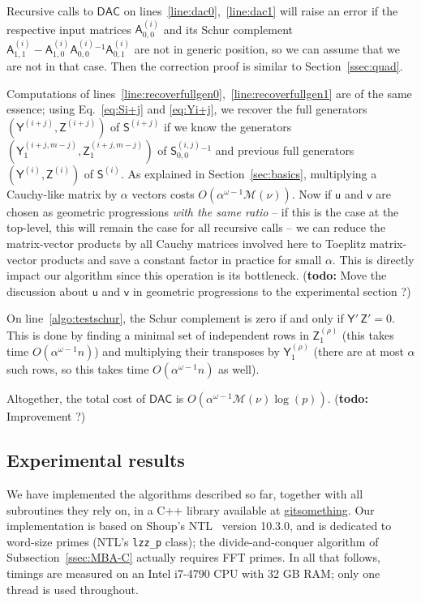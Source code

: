 \documentclass{sig-alternate}
\newcommand{\vu}{\ensuremath{\mathsf{u}}}
\newcommand{\vv}{\ensuremath{\mathsf{v}}}
\newcommand{\mA}{\ensuremath{\mathsf{A}}}
\newcommand{\mS}{\ensuremath{\mathsf{S}}}
\newcommand{\mY}{\ensuremath{\mathsf{Y}}}
\newcommand{\mZ}{\ensuremath{\mathsf{Z}}}
\newcommand{\M}{\ensuremath{\mathscr{M}}}
\newcommand{\mx}{\ensuremath{\nu}}
\newcommand{\DAC}{\ensuremath{\mathsf{DAC}}}
\newcommand{\todo}[1]{(\textbf{todo:} #1)}
\begin{document}
Recursive calls to $\DAC$ on lines~\ref{line:dac0},~\ref{line:dac1}
will raise an error if the respective input matrices
${\mA^{(i)}_{0,0}}$ and its Schur complement
$\mA^{(i)}_{1,1} - \mA^{(i)}_{1,0} {\mA^{(i)}_{0,0}}{}^{-1}
\mA^{(i)}_{0,1}$
are not in generic position, so we can assume that we are not in that
case. Then the correction proof is similar to Section~\ref{ssec:quad}.

\smallskip{} Computations of
lines~\ref{line:recoverfullgen0},~\ref{line:recoverfullgen1} are of
the same essence; using Eq.~\eqref{eq:Si+j} and \eqref{eq:Yi+j}, we
recover the full generators $(\mY^{(i+j)},\mZ^{(i+j)})$ of
$\mS^{(i+j)}$ if we know the generators
$(\mY^{(i+j,m-j)}_1,\mZ^{(i+j,m-j)}_1)$ of $\mS^{(i,j)}_{0,0}{}^{-1}$
and previous full generators $(\mY^{(i)},\mZ^{(i)})$ of $\mS^{(i)}$.
As explained in Section~\ref{sec:basics}, multiplying a Cauchy-like
matrix by $\alpha$ vectors costs $O(\alpha^{\omega-1} \M(\mx))$.  Now
if $\vu$ and $\vv$ are chosen as geometric progressions {\em with the
  same ratio} -- if this is the case at the top-level, this will
remain the case for all recursive calls -- we can reduce the
matrix-vector products by all Cauchy matrices involved here to
Toeplitz matrix-vector products and save a constant factor in practice
for small $\alpha$. This is directly impact our algorithm since this
operation is its bottleneck.
%
\todo{Move the discussion about $\vu$ and $\vv$ in geometric
  progressions to the experimental section ?}
%

On line~\ref{algo:testschur}, the Schur complement is zero if and only
if $\mY'\, \mZ' = 0$. This is done by finding a minimal set of
independent rows in $\mZ^{(\rho)}_1$ (this takes time
$O(\alpha^{\omega-1} n)$) and multiplying their transposes by
${\mY^{(\rho)}_1}$ (there are at most $\alpha$ such rows, so this
takes time $O(\alpha^{\omega-1} n)$ as well).

Altogether, the total cost of $\DAC$ is
$O(\alpha^{\omega-1} \M(\mx) \log(p))$.
%
\todo{Improvement ?}


\subsection{Experimental results}

We have implemented the algorithms described so far, together with all
subroutines they rely on, in a C++ library available at
\url{gitsomething}. Our implementation is based on Shoup's
NTL~\cite{Shoup95,NTL} version 10.3.0, and is dedicated to word-size
primes (NTL's \texttt{lzz\_p} class); the divide-and-conquer algorithm
of Subsection~\ref{ssec:MBA-C} actually requires FFT primes.  In all
that follows, timings are measured on an Intel i7-4790 CPU with 32 GB
RAM; only one thread is used throughout.
\end{document}
